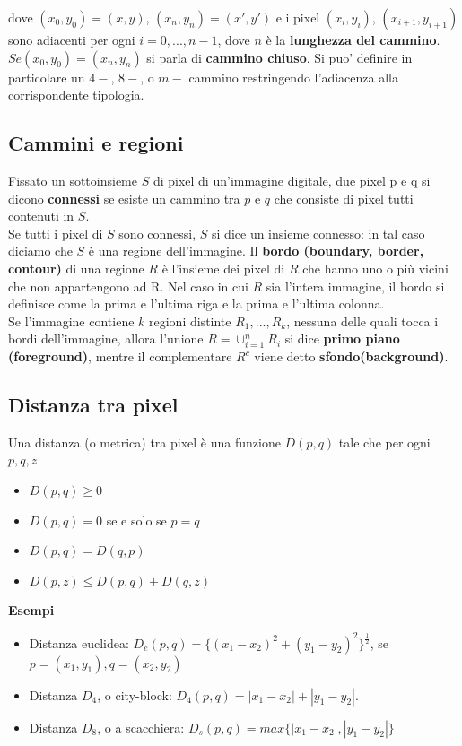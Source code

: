 dove $(x_0, y_0) = (x,y)$, $(x_n, y_n) = (x', y')$ e i pixel $(x_i, y_i)$,
$(x_{i+1}, y_{i+1})$ sono adiacenti per ogni $i=0, ... , n-1$, dove $n$ è la
\textbf{lunghezza del cammino}. $Se (x_0, y_0) = (x_n, y_n)$ si parla di
\textbf{cammino chiuso}. Si puo' definire in particolare un $4-$, $8-$, o
$m-$ cammino restringendo l'adiacenza alla corrispondente tipologia.

\subsection{Cammini e regioni}

Fissato un sottoinsieme $S$ di pixel di un'immagine digitale, due pixel p e q si
dicono \textbf{connessi} se esiste un cammino tra $p$ e $q$ che consiste di
pixel tutti contenuti in $S$. \\Se tutti i pixel di $S$ sono connessi, $S$ si
dice un insieme connesso: in tal caso diciamo che $S$ è una regione
dell'immagine. Il \textbf{bordo (boundary, border, contour)} di una regione $R$
è l'insieme dei pixel di $R$ che hanno uno o più vicini che non appartengono ad
R. Nel caso in cui $R$ sia l'intera immagine, il bordo si definisce come la
prima e l'ultima riga e la prima e l'ultima colonna. \\Se l'immagine contiene
$k$ regioni distinte $R_1,..., R_k$, nessuna delle quali tocca i bordi
dell'immagine, allora l'unione $R = \cup_{i=1}^n R_i$ si dice \textbf{primo
    piano (foreground)}, mentre il complementare $R^c$ viene detto
\textbf{sfondo(background)}.

\subsection{Distanza tra pixel}

Una distanza (o metrica) tra pixel è una funzione $D(p, q)$ tale che per ogni
$p, q, z$

\begin{itemize}
    \item $D(p, q) \ge 0$
    \item $D(p, q) = 0$ se e solo se $p = q$
    \item $D(p, q) = D(q, p)$
    \item $D(p, z) \le D(p, q) + D(q, z)$
\end{itemize}

\textbf{Esempi}

\begin{itemize}
    \item Distanza euclidea: $D_e(p, q) = \{(x_1 - x_2)^2 + (y_1 - y_2)^2\}^{\frac{1}{2}}$, se $p = (x_1, y_1), q=(x_2, y_2)$
    \item Distanza $D_4$, o city-block: $D_4(p, q) = |x_1 - x_2| + |y_1 - y_2|$.
    \item Distanza $D_8$, o a scacchiera: $D_s(p,q) = max\{|x_1 - x_2|, |y_1 - y_2|\}$
\end{itemize}

